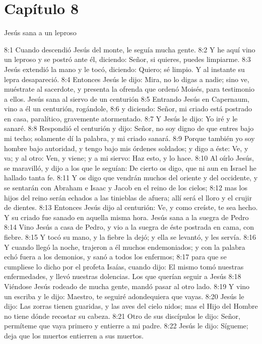 \section*{Capítulo 8}
Jesús sana a un leproso  

8:1 Cuando descendió Jesús del monte, le seguía mucha gente. 
8:2 Y he aquí vino un leproso y se postró ante él, diciendo: Señor, si quieres, puedes limpiarme. 
8:3 Jesús extendió la mano y le tocó, diciendo: Quiero; sé limpio. Y al instante su lepra desapareció. 
8:4 Entonces Jesús le dijo: Mira, no lo digas a nadie; sino ve, muéstrate al sacerdote, y presenta la ofrenda que ordenó Moisés, para testimonio a ellos. 
Jesús sana al siervo de un centurión  
8:5 Entrando Jesús en Capernaum, vino a él un centurión, rogándole, 
8:6 y diciendo: Señor, mi criado está postrado en casa, paralítico, gravemente atormentado. 
8:7 Y Jesús le dijo: Yo iré y le sanaré. 
8:8 Respondió el centurión y dijo: Señor, no soy digno de que entres bajo mi techo; solamente dí la palabra, y mi criado sanará. 
8:9 Porque también yo soy hombre bajo autoridad, y tengo bajo mis órdenes soldados; y digo a éste: Ve, y va; y al otro: Ven, y viene; y a mi siervo: Haz esto, y lo hace. 
8:10 Al oírlo Jesús, se maravilló, y dijo a los que le seguían: De cierto os digo, que ni aun en Israel he hallado tanta fe. 
8:11 Y os digo que vendrán muchos del oriente y del occidente, y se sentarán con Abraham e Isaac y Jacob en el reino de los cielos; 
8:12 mas los hijos del reino serán echados a las tinieblas de afuera; allí será el lloro y el crujir de dientes. 
8:13 Entonces Jesús dijo al centurión: Ve, y como creíste, te sea hecho. Y su criado fue sanado en aquella misma hora. 
Jesús sana a la suegra de Pedro  
8:14 Vino Jesús a casa de Pedro, y vio a la suegra de éste postrada en cama, con fiebre. 
8:15 Y tocó su mano, y la fiebre la dejó; y ella se levantó, y les servía. 
8:16 Y cuando llegó la noche, trajeron a él muchos endemoniados; y con la palabra echó fuera a los demonios, y sanó a todos los enfermos; 
8:17 para que se cumpliese lo dicho por el profeta Isaías, cuando dijo: El mismo tomó nuestras enfermedades, y llevó nuestras dolencias. 
Los que querían seguir a Jesús  
8:18 Viéndose Jesús rodeado de mucha gente, mandó pasar al otro lado. 
8:19 Y vino un escriba y le dijo: Maestro, te seguiré adondequiera que vayas. 
8:20 Jesús le dijo: Las zorras tienen guaridas, y las aves del cielo nidos; mas el Hijo del Hombre no tiene dónde recostar su cabeza. 
8:21 Otro de sus discípulos le dijo: Señor, permíteme que vaya primero y entierre a mi padre. 
8:22 Jesús le dijo: Sígueme; deja que los muertos entierren a sus muertos. 
